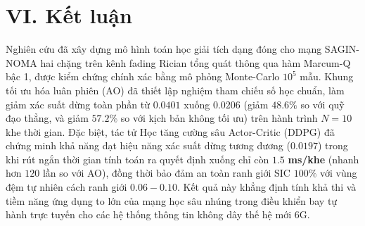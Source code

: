 \section*{VI. Kết luận}

Nghiên cứu đã xây dựng mô hình toán học giải tích dạng đóng cho mạng SAGIN-NOMA hai chặng trên kênh fading Rician tổng quát thông qua hàm Marcum-Q bậc 1, được kiểm chứng chính xác bằng mô phỏng Monte-Carlo $10^5$ mẫu. Khung tối ưu hóa luân phiên (AO) đã thiết lập nghiệm tham chiếu số học chuẩn, làm giảm xác suất dừng toàn phần từ $0.0401$ xuống $0.0206$ (giảm $48.6\%$ so với quỹ đạo thẳng, và giảm $57.2\%$ so với kịch bản không tối ưu) trên hành trình $N=10$ khe thời gian. Đặc biệt, tác tử Học tăng cường sâu Actor-Critic (DDPG) đã chứng minh khả năng đạt hiệu năng xác suất dừng tương đương ($0.0197$) trong khi rút ngắn thời gian tính toán ra quyết định xuống chỉ còn $\mathbf{1.5}$ \textbf{ms/khe} (nhanh hơn $120$ lần so với AO), đồng thời bảo đảm an toàn ranh giới SIC $100\%$ với vùng đệm tự nhiên cách ranh giới $0.06 - 0.10$. Kết quả này khẳng định tính khả thi và tiềm năng ứng dụng to lớn của mạng học sâu nhúng trong điều khiển bay tự hành trực tuyến cho các hệ thống thông tin không dây thế hệ mới 6G.
